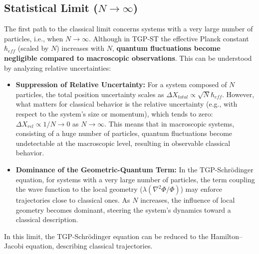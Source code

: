 \documentclass[11pt,a4paper]{article}
\begin{document}
\subsection{Statistical Limit ($N \rightarrow \infty$)}
The first path to the classical limit concerns systems with a very large number of particles, i.e., when $N \rightarrow \infty$. Although in TGP-ST the effective Planck constant $\hbar_{eff}$ (scaled by $N$) increases with $N$, \textbf{quantum fluctuations become negligible compared to macroscopic observations}. This can be understood by analyzing relative uncertainties:
\begin{itemize}
    \item \textbf{Suppression of Relative Uncertainty:} For a system composed of $N$ particles, the total position uncertainty scales as $\Delta X_{total} \propto \sqrt{N}\hbar_{eff}$. However, what matters for classical behavior is the relative uncertainty (e.g., with respect to the system’s size or momentum), which tends to zero: $\Delta X_{rel} \propto 1/N \rightarrow 0$ as $N \rightarrow \infty$. This means that in macroscopic systems, consisting of a huge number of particles, quantum fluctuations become undetectable at the macroscopic level, resulting in observable classical behavior.
    \item \textbf{Dominance of the Geometric-Quantum Term:} In the TGP-Schrödinger equation, for systems with a very large number of particles, the term coupling the wave function to the local geometry ($\lambda(\nabla^2\Phi/\Phi)$) may enforce trajectories close to classical ones. As $N$ increases, the influence of local geometry becomes dominant, steering the system’s dynamics toward a classical description.
\end{itemize}
In this limit, the TGP-Schrödinger equation can be reduced to the Hamilton–Jacobi equation, describing classical trajectories.
\end{document}

